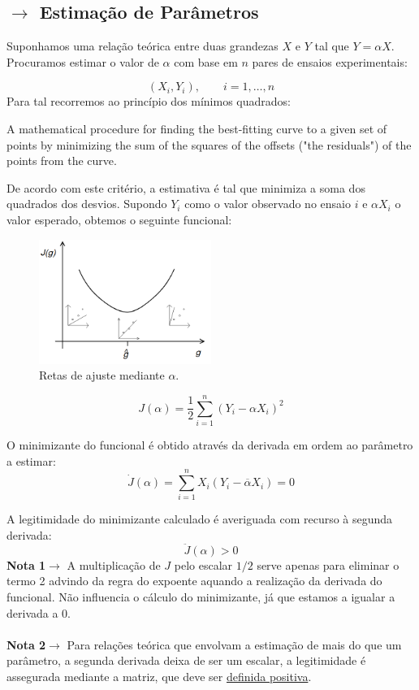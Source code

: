 \label{sec:leastSquares}
\subsection[5.1 Estimação de Parâmetros]{$\rightarrow$ Estimação de Parâmetros}
\noindent Suponhamos uma relação teórica entre duas grandezas $X$ e $Y$ tal que $Y = \alpha X$. Procuramos estimar o valor de $\alpha$ com base em $n$ pares de ensaios experimentais:

$$
    (X_i,Y_i),\qquad i = 1,\hdots, n
$$
Para tal recorremos ao princípio dos mínimos quadrados:
\begin{theo}{}
    A mathematical procedure for finding the best-fitting curve to a given set of points by minimizing the sum of the squares of the offsets ("the residuals") of the points from the curve. 
\end{theo}

\noindent De acordo com este critério, a estimativa é tal que minimiza a soma dos quadrados dos desvios. Supondo $Y_i$ como o valor observado no ensaio $i$ e $\alpha X_i$ o valor esperado, obtemos o seguinte funcional:

\begin{figure}
    \centering
    \includegraphics[width=0.5\textwidth]{img/least-aquare/Fcurve.png}
    \caption{Retas de ajuste mediante $\alpha$.}
    \label{fig:curvaF}
\end{figure}

$$
    J(\alpha) = \dfrac{1}{2}\sum_{i=1}^{n} (Y_i - \alpha X_i)^2
$$

\noindent O minimizante do funcional é obtido através da derivada em ordem ao parâmetro a estimar:
$$
    \dot{J}(\alpha) = \sum_{i=1}^{n} X_i(Y_i - \overline{\alpha} X_i) = 0
$$

\noindent A legitimidade do minimizante calculado é averiguada com recurso à segunda derivada\footnotemark[3]:
$$
    \ddot{J}(\alpha) > 0 
$$
\noindent\textbf{Nota 1}$\rightarrow$ A multiplicação de $J$ pelo escalar $1/2$ serve apenas para eliminar o termo 2 advindo da regra do expoente aquando a realização da derivada do funcional. Não influencia o cálculo do minimizante, já que estamos a igualar a derivada a 0.
\\\\
\noindent\textbf{Nota 2}$\rightarrow$ Para relações teórica que envolvam a estimação de mais do que um parâmetro, a segunda derivada deixa de ser um escalar, a legitimidade é assegurada mediante a matriz, que deve ser \underline{definida positiva}.

